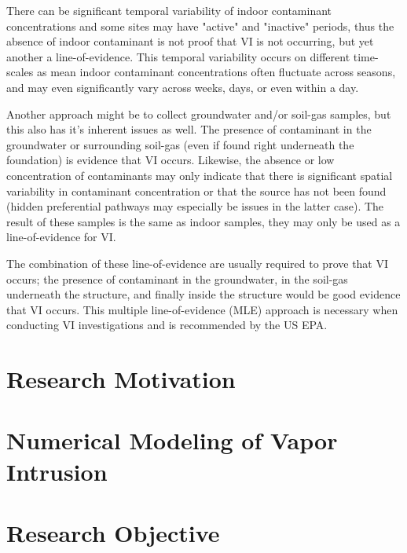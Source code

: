 \documentclass[../thesis.tex]{subfiles}
\begin{document}
There can be significant temporal variability of indoor contaminant concentrations and some sites may have "active" and "inactive" periods, thus the absence of indoor contaminant is not proof that VI is not occurring, but yet another a line-of-evidence.
This temporal variability occurs on different time-scales as mean indoor contaminant concentrations often fluctuate across seasons, and may even significantly vary across weeks, days, or even within a day.

Another approach might be to collect groundwater and/or soil-gas samples, but this also has it's inherent issues as well.
The presence of contaminant in the groundwater or surrounding soil-gas (even if found right underneath the foundation) is evidence that VI occurs.
Likewise, the absence or low concentration of contaminants may only indicate that there is significant spatial variability in contaminant concentration or that the source has not been found (hidden preferential pathways may especially be issues in the latter case).
The result of these samples is the same as indoor samples, they may only be used as a line-of-evidence for VI.

The combination of these line-of-evidence are usually required to prove that VI occurs; the presence of contaminant in the groundwater, in the soil-gas underneath the structure, and finally inside the structure would be good evidence that VI occurs.
This multiple line-of-evidence (MLE) approach is necessary when conducting VI investigations and is recommended by the US EPA.

\section{Research Motivation}




\section{Numerical Modeling of Vapor Intrusion}

\section{Research Objective}
\end{document}
